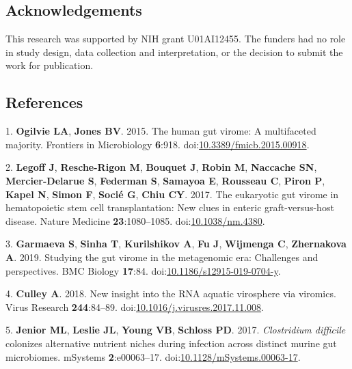 \documentclass[11pt,]{article}
\begin{document}
\hypertarget{acknowledgements}{%
\subsection{Acknowledgements}\label{acknowledgements}}

This research was supported by NIH grant U01AI12455. The funders had no
role in study design, data collection and interpretation, or the
decision to submit the work for publication.

\newpage

\hypertarget{references}{%
\subsection{References}\label{references}}

\hypertarget{refs}{}
\leavevmode\hypertarget{ref-ogilvie_human_2015}{}%
1. \textbf{Ogilvie LA}, \textbf{Jones BV}. 2015. The human gut virome: A
multifaceted majority. Frontiers in Microbiology \textbf{6}:918.
doi:\href{https://doi.org/10.3389/fmicb.2015.00918}{10.3389/fmicb.2015.00918}.

\leavevmode\hypertarget{ref-legoff_eukaryotic_2017}{}%
2. \textbf{Legoff J}, \textbf{Resche-Rigon M}, \textbf{Bouquet J},
\textbf{Robin M}, \textbf{Naccache SN}, \textbf{Mercier-Delarue S},
\textbf{Federman S}, \textbf{Samayoa E}, \textbf{Rousseau C},
\textbf{Piron P}, \textbf{Kapel N}, \textbf{Simon F}, \textbf{Socié G},
\textbf{Chiu CY}. 2017. The eukaryotic gut virome in hematopoietic stem
cell transplantation: New clues in enteric graft-versus-host disease.
Nature Medicine \textbf{23}:1080--1085.
doi:\href{https://doi.org/10.1038/nm.4380}{10.1038/nm.4380}.

\leavevmode\hypertarget{ref-garmaeva_studying_2019}{}%
3. \textbf{Garmaeva S}, \textbf{Sinha T}, \textbf{Kurilshikov A},
\textbf{Fu J}, \textbf{Wijmenga C}, \textbf{Zhernakova A}. 2019.
Studying the gut virome in the metagenomic era: Challenges and
perspectives. BMC Biology \textbf{17}:84.
doi:\href{https://doi.org/10.1186/s12915-019-0704-y}{10.1186/s12915-019-0704-y}.

\leavevmode\hypertarget{ref-culley_new_2018}{}%
4. \textbf{Culley A}. 2018. New insight into the RNA aquatic virosphere
via viromics. Virus Research \textbf{244}:84--89.
doi:\href{https://doi.org/10.1016/j.virusres.2017.11.008}{10.1016/j.virusres.2017.11.008}.

\leavevmode\hypertarget{ref-jenior_clostridium_2017}{}%
5. \textbf{Jenior ML}, \textbf{Leslie JL}, \textbf{Young VB},
\textbf{Schloss PD}. 2017. \emph{Clostridium difficile} colonizes
alternative nutrient niches during infection across distinct murine gut
microbiomes. mSystems \textbf{2}:e00063--17.
doi:\href{https://doi.org/10.1128/mSystems.00063-17}{10.1128/mSystems.00063-17}.
\end{document}
